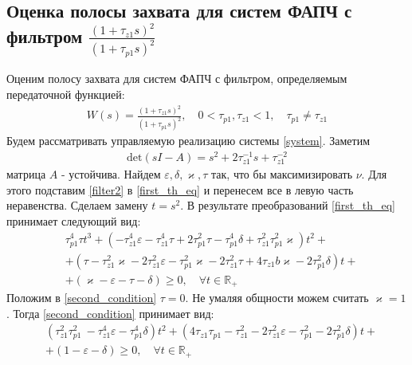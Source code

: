 \documentclass[a4paper,article,14pt]{extarticle}
\begin{document}
\subsection{Оценка полосы захвата для систем ФАПЧ с фильтром $\frac{(1+\tau_{z1}s)^2}{(1+\tau_{p1}s)^2}$}
Оценим полосу захвата для систем ФАПЧ с фильтром, определяемым передаточной функцией:
 \begin{equation}\label{filter2}
 \begin{aligned}
W(s) = \frac{(1+\tau_{z1}s)^2}{(1+\tau_{p1}s)^2}, \quad 0<\tau_{p1},\tau_{z1} < 1, \quad \tau_{p1} \neq \tau_{z1}
 \end{aligned}
\end{equation}
Будем рассматривать управляемую реализацию системы \eqref{system}. Заметим
 \begin{equation}
 \begin{aligned}
\text{det}(sI-A) = s^2 + 2\tau_{z1}^{-1}s + \tau_{z1}^{-2}
 \end{aligned}
\end{equation}
матрица $A$ - устойчива. Найдем $\varepsilon, \delta, \varkappa, \tau$ так, что бы максимизировать $\nu$. Для этого подставим \eqref{filter2} в \eqref{first_th_eq} и перенесем все в левую часть неравенства. Сделаем замену $t = s^2$. В результате преобразований \eqref{first_th_eq} принимает следующий вид:
 \begin{equation}\label{second_condition}
 \begin{aligned}
&\tau_{p1}^4\tau t^3 +(- \tau_{z1}^4\varepsilon - \tau_{z1}^4\tau + 2\tau_{p1}^2\tau- \tau_{p1}^4\delta + \tau_{z1}^2\tau_{p1}^2\varkappa)t^2 +\\
&+( \tau- \tau_{z1}^2\varkappa - 2\tau_{z1}^2\varepsilon - \tau_{p1}^2\varkappa- 2\tau_{z1}^2\tau + 4\tau_{z1}b\varkappa- 2\tau_{p1}^2\delta)t + \\
&+ (\varkappa-\varepsilon - \tau - \delta)  \geqslant 0, \quad \forall t \in \mathbb{R_+}
 \end{aligned}
\end{equation}
Положим в \eqref{second_condition} $\tau = 0$. Не умаляя общности можем считать $\varkappa = 1$. Тогда \eqref{second_condition} принимает вид:
 \begin{equation}\label{second_condition_tau_zero}
 \begin{aligned}
&(\tau_{z1}^2\tau_{p1}^2\ - \tau_{z1}^4\varepsilon - \tau_{p1}^4\delta)t^2 +( 4\tau_{z1}\tau_{p1} - \tau_{z1}^2 - 2\tau_{z1}^2\varepsilon - \tau_{p1}^2 - 2\tau_{p1}^2\delta)t + \\
&+ (1-\varepsilon - \delta)  \geqslant 0, \quad \forall t \in \mathbb{R_+}
 \end{aligned}
\end{equation}
\end{document}
